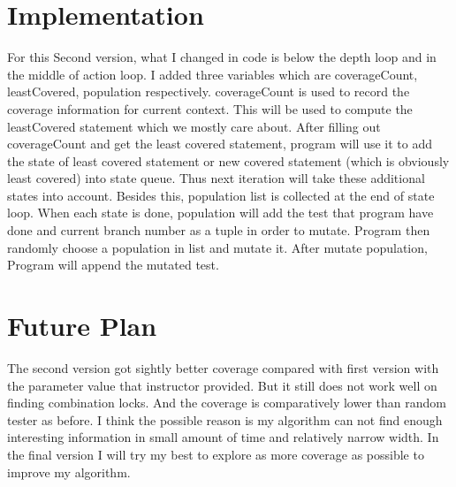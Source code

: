 \documentclass[11pt]{article}
\theoremstyle{plain}
\theoremstyle{definition}
\begin{document}
\section{Implementation}
For this Second version, what I changed in code is below the depth loop and in the middle of action loop. I added three variables which are coverageCount, leastCovered, population respectively. coverageCount is used to record the coverage information for current context. This will be used to compute the leastCovered statement which we mostly care about. After filling out coverageCount and get the least covered statement, program will use it to add the state of least covered statement or new covered statement (which is obviously least covered) into state queue. Thus next iteration will take these additional states into account. Besides this, population list is collected at the end of state loop. When each state is done, population will add the test that program have done and current branch number as a tuple in order to mutate. Program then randomly choose a population in list and mutate it. After mutate population, Program will append the mutated test.

\section{Future Plan}
The second version got sightly better coverage compared with first version with the parameter value that instructor provided. But it still does not work well on finding combination locks. And the coverage is comparatively lower than random tester as before. I think the possible reason is my algorithm can not find enough interesting information in small amount of time and relatively narrow width. In the final version I will try my best to explore as more coverage as possible to improve my algorithm.
\end{document}
